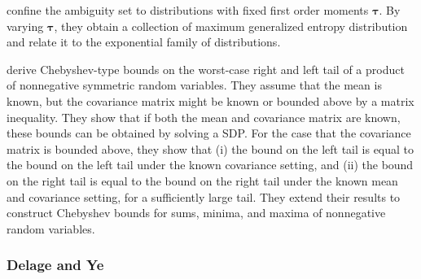 \documentclass[final,onefignum,onetabnum]{class}
\newcommand{\bs}[1]{\boldsymbol{#1}} %
\begin{document}
\citet{grunwald2004game} confine  the ambiguity set to distributions with fixed first order moments $\bs{\tau}$. By varying $\bs{\tau}$, they obtain a collection of maximum generalized entropy distribution and relate it to the exponential family of distributions. 



\citet{rujeerapaiboon2018chebyshev} derive Chebyshev-type bounds on the worst-case right and left tail of a product of 
nonnegative symmetric  random variables. They assume that the mean is known, but the covariance matrix might be known or bounded above by a matrix inequality. They show that if both the mean and covariance matrix are known, these bounds can
be obtained by solving a SDP. For the case that the covariance matrix is bounded above, they show that (i) the bound on the left tail is equal to the  bound on the left tail under the known covariance setting, and (ii) the bound on the right tail is equal to the bound on the right tail under the known mean and covariance setting, for a sufficiently large tail. They extend their results to construct Chebyshev bounds for sums, minima,
and maxima of nonnegative random variables. %



\subsubsection{Delage and Ye}
\label{sec: rev.DelageYe}

 
\end{document}
